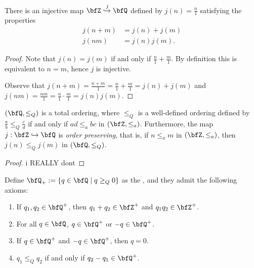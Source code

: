     \begin{lemma}\label{lemma:order-embedding-z-q}
        There is an injective map $\bfZ \xhookrightarrow{j} \bfQ$ defined by $j(n) = \frac{n}{1}$ satisfying the properties
            \begin{equation*}
            \begin{split}
                j(n+m) &= j(n) + j(m)\\
                j(nm) &= j(n)j(m).
            \end{split}
            \end{equation*}
    \end{lemma}
        \begin{proof}
            Note that $j(n) = j(m)$ if and only if $\frac{n}{1} + \frac{m}{1}$. By definition this is equivalent to $n = m$, hence $j$ is injective.
            
            Observe that $j(n+m) = \frac{n+m}{1} = \frac{n}{1} + \frac{m}{1} = j(n) + j(m)$ and $j(nm) = \frac{nm}{1} = \frac{n}{1}\cdot\frac{m}{1} = j(n)j(m)$.
        \end{proof}
    
    \begin{theorem}\label{thm:q-total-ordering}
        $(\bfQ,\leq_Q)$ is a total ordering, where $\leq_Q$ is a well-defined ordering defined by $\frac{a}{b} \leq_Q \frac{c}{d}$ if and only if $ad \leq_a bc$ in $(\bfZ,\leq_a)$. Furthermore, the map $j:\bfZ \hookrightarrow \bfQ$ is \textit{order preserving}, that is, if $n \leq_a m$ in $(\bfZ, \leq_a)$, then $j(n) \leq_Q j(m)$ in $(\bfQ,\leq_Q)$.
    \end{theorem}
        \begin{proof}
            {\color{red} i REALLY dont}
        \end{proof}
    
    \begin{definition}
        Define $\bfQ_+ := \{q \in \bfQ \mid q \geq_Q 0\}$ as the , and they admit the following axioms:
            \begin{enumerate}[label = (\arabic*)]
                \item If $q_1,q_2 \in \bfQ^+$, then $q_1+q_2 \in \bfZ^+$ and $q_1 q_2 \in \bfZ^+$.
                \item For all $q \in \bfQ$, $q \in \bfQ^+$ or $-q \in \bfQ^+$.
                \item If $q \in \bfQ^+$ and $-q \in \bfQ^+$, then $q=0$.
                \item $q_1 \leq_Q q_2$ if and only if $q_2 - q_1 \in \bfQ^+$.
            \end{enumerate}
    \end{definition}

